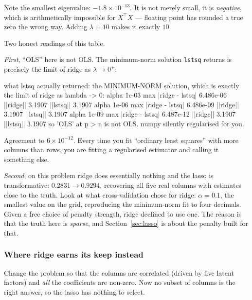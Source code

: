 \documentclass[11pt]{article}
\newcommand{\XtX}{X^{\!\top}\!X}
\begin{document}
Note the smallest eigenvalue: $-1.8\times10^{-13}$. It is not merely small,
it is \emph{negative}, which is arithmetically impossible for
$\XtX$ --- floating point has rounded a true zero the wrong way. Adding
$\lambda = 10$ makes it exactly $10$.

Two honest readings of this table.

\emph{First}, ``OLS'' here is not OLS. The minimum-norm solution
\texttt{lstsq} returns is precisely the limit of ridge as
$\lambda \to 0^{+}$:

\begin{codeout}
what lstsq actually returned: the MINIMUM-NORM solution, which is
exactly the limit of ridge as lambda -> 0:
   alpha 1e-03   max |ridge - lstsq| 6.486e-06   ||ridge|| 3.1907  ||lstsq|| 3.1907
   alpha 1e-06   max |ridge - lstsq| 6.486e-09   ||ridge|| 3.1907  ||lstsq|| 3.1907
   alpha 1e-09   max |ridge - lstsq| 6.487e-12   ||ridge|| 3.1907  ||lstsq|| 3.1907
so 'OLS' at p > n is not OLS. numpy silently regularised for you.
\end{codeout}

Agreement to $6\times10^{-12}$. Every time you fit ``ordinary least squares''
with more columns than rows, you are fitting a regularised estimator and
calling it something else.

\emph{Second}, on this problem ridge does essentially nothing and the lasso
is transformative: $0.2831 \to 0.9294$, recovering all five real columns with
estimates close to the truth. Look at what cross-validation chose for ridge:
$\alpha = 0.1$, the smallest value on the grid, reproducing the minimum-norm
fit to four decimals. Given a free choice of penalty strength, ridge declined
to use one. The reason is that the truth here is \emph{sparse}, and
Section~\ref{sec:lasso} is about the penalty built for that.

\subsubsection*{Where ridge earns its keep instead}

Change the problem so that the columns are correlated (driven by five latent
factors) and \emph{all} the coefficients are non-zero. Now no subset of
columns is the right answer, so the lasso has nothing to select.
\end{document}

